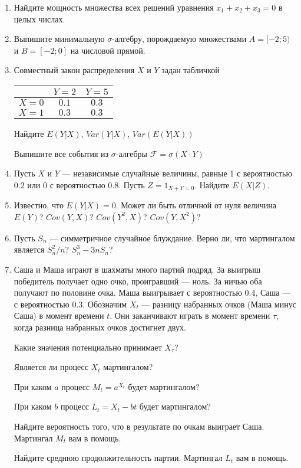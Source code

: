 \documentclass[10pt,a4paper]{article}
\begin{document}
\begin{enumerate}
\item Найдите мощность множества всех решений уравнения $x_1+x_2+x_3=0$ в целых числах. 
\item Выпишите минимальную $\sigma$-алгебру, порождаемую множествами $A=[-2;5)$ и $B=[-2;0]$ на числовой прямой.
\item Совместный закон распределения $X$ и $Y$ задан табличкой

\begin{tabular}{c|cc}
 & $Y=2$ & $Y=5$ \\ 
\hline 
$X=0$ & $0.1$ & $0.3$ \\ 
$X=1$ & $0.3$ & $0.3$ \\ 
\end{tabular} 

Найдите $E(Y|X)$, $Var(Y|X)$, $Var(E(Y|X))$

Выпишите все события из  $\sigma$-алгебры $\mathcal{F}=\sigma(X\cdot Y)$

\item Пусть $X$ и $Y$ --- независимые случайные величины, равные 1 с
вероятностью $0.2$ или 0 с вероятностью $0.8$. Пусть $Z=1_{X+Y=0}$. Найдите
$E(X|Z)$. 

\item Известно, что $E(Y|X)=0$. Может ли быть отличной от нуля величина $E(Y)$? $Cov(Y,X)$? $Cov(Y^2,X)$? $Cov(Y, X^2)$?

\item Пусть $S_n$ --- симметричное случайное блуждание. Верно ли, что мартингалом является $S_n^2/n$? $S_n^3-3nS_n$?

\item Саша и Маша играют в шахматы много партий подряд. За выигрыш победитель получает одно очко, проигравший --- ноль. За ничью оба получают по половине очка. Маша выигрывает с вероятностью $0.4$, Саша --- с вероятностью $0.3$. Обозначим $X_t$ --- разницу набранных очков (Маша минус Саша) в момент времени $t$. Они заканчивают играть в момент времени $\tau$, когда разница набранных очков достигнет двух.

Какие значения потенциально принимает $X_{\tau}$?

Является ли процесс $X_t$ мартингалом?

При каком $a$ процесс $M_t=a^{X_t}$ будет мартингалом?

При каком $b$ процесс $L_t=X_t - bt$ будет мартингалом?

Найдите вероятность того, что в результате по очкам выиграет Саша. Мартингал $M_t$ вам в помощь.

Найдите среднюю продолжительность партии. Мартингал $L_t$ вам в помощь.




\end{enumerate}
\end{document}
